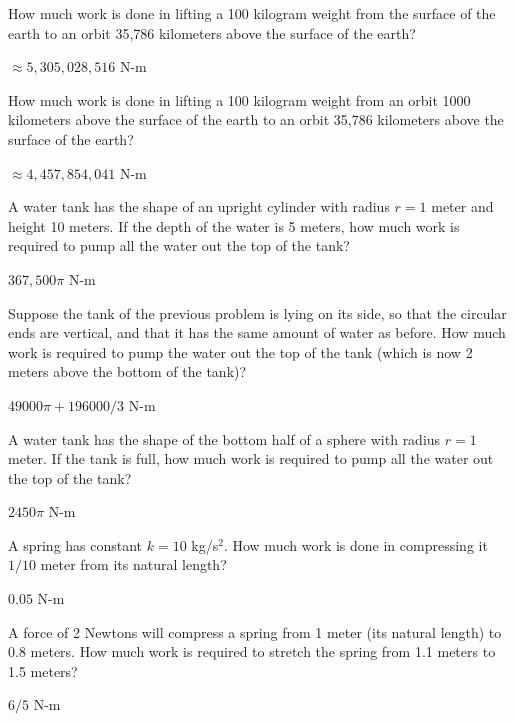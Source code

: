 \begin{exercises}

\exercise How much work is done in lifting a 100 kilogram weight from
the surface of the earth to an orbit 35,786 kilometers above the
surface of the earth?
\begin{answer} $\approx 5,305,028,516$ N-m
\end{answer}

\exercise How much work is done in lifting a 100 kilogram weight from
an orbit 1000 kilometers above the surface of the earth to an orbit
35,786 kilometers above the surface of the earth?
\begin{answer} $\approx 4,457,854,041$ N-m
\end{answer}

\exercise A water tank has the shape of an upright cylinder with radius $r=1$
meter and height 10 meters. If the depth of the water is 5 meters, how
much work is required to pump all the water out the top of the tank?
\begin{answer} $367,500 \pi$ N-m
\end{answer}

\exercise Suppose the tank of the previous problem is lying on its
side, so that the circular ends are vertical, and that it has the same
amount of water as before. How much work is required to pump the water
out the top of the tank (which is now 2 meters above the bottom of the
tank)?
\begin{answer} $49000\pi + 196000/3$ N-m
\end{answer}

\exercise A water tank has the shape of the bottom half of a sphere
with radius $r=1$ meter. If the tank is full,
how much work is required to pump all the water out
the top of the tank?
\begin{answer} $2450\pi$ N-m
\end{answer}

\exercise A spring has constant $k=10$ kg/s$^2$. How much work is done
in compressing it $1/10$ meter from its natural length?
\begin{answer} $0.05$ N-m
\end{answer}

\exercise A force of 2 Newtons will compress a spring from 1 meter
(its natural length) to
0.8 meters. How much work is required to stretch the spring from 
1.1 meters to 1.5 meters?
\begin{answer} $6/5$ N-m
\end{answer}


\end{exercises}
